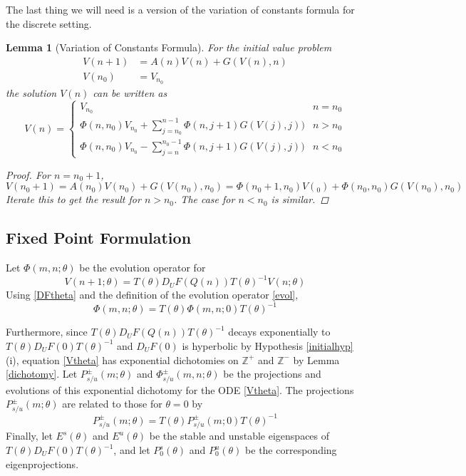 \documentclass[12pt]{article}
\def\Z{{\mathbb Z}}
\newtheorem{lemma}{Lemma}
\begin{document}
The last thing we will need is a version of the variation of constants formula for the discrete setting.

\begin{lemma}[Variation of Constants Formula]\label{VOC}
For the initial value problem
\begin{align*}
V(n+1) &= A(n) V(n) + G(V(n), n) \\
V(n_0) &= V_{n_0}
\end{align*}
the solution $V(n)$ can be written as 
\begin{equation}\label{VOCformula}
V(n) = 
\begin{cases}
V_{n_0} & n = n_0 \\
\Phi(n, n_0) V_{n_0} + \sum_{j = n_0}^{n-1} \Phi(n, j+1) G(V(j), j)) & n > n_0 \\
\Phi(n, n_0) V_{n_0} - \sum_{j = n}^{n_0-1} \Phi(n, j+1) G(V(j), j)) & n < n_0 
\end{cases}
\end{equation}
\begin{proof}
For $n = n_0 + 1$,
\[
V(n_0 + 1) = A(n_0) V(n_0) + G(V(n_0), n_0) = \Phi(n_0+1, n_0) V(_0) + \Phi(n_0, n_0) G(V(n_0), n_0)
\]
Iterate this to get the result for $n > n_0$. The case for $n < n_0$ is similar.
\end{proof}
\end{lemma}

\subsection{Fixed Point Formulation}

Let $\Phi(m, n; \theta)$ be the evolution operator for
\begin{equation}\label{Vtheta}
V(n+1; \theta) = T(\theta) D_U F(Q(n)) T(\theta)^{-1} V(n; \theta) 
\end{equation}
Using \eqref{DFtheta} and the definition of the evolution operator \eqref{evol},
\[
\Phi(m, n; \theta) = T(\theta)\Phi(m, n; 0)T(\theta)^{-1}
\]

Furthermore, since $T(\theta) D_U F(Q(n)) T(\theta)^{-1}$ decays exponentially to $T(\theta) D_U F(0) T(\theta)^{-1}$ and $D_U F(0)$ is hyperbolic by Hypothesis \ref{initialhyp}(i), equation \eqref{Vtheta} has exponential dichotomies on $\Z^+$ and $\Z^-$ by Lemma \ref{dichotomy}. Let $P_{s/u}^\pm(m; \theta)$ and $\Phi_{s/u}^\pm(m, n; \theta)$ be the projections and evolutions of this exponential dichotomy for the ODE \ref{Vtheta}. The projections $P_{s/u}^\pm(m; \theta)$ are related to those for $\theta = 0$ by
\[
P_{s/u}^\pm(m; \theta) = T(\theta)P_{s/u}^\pm(m; 0)T(\theta)^{-1}
\]
Finally, let $E^s(\theta)$ and $E^u(\theta)$ be the stable and unstable eigenspaces of $T(\theta) D_U F(0) T(\theta)^{-1}$, and let $P_0^s(\theta)$ and $P_0^u(\theta)$ be the corresponding eigenprojections.
\end{document}
